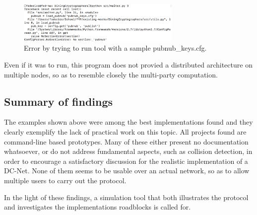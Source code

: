 \begin{figure}[h!]
    \centering
    \includegraphics[width=0.7\textwidth]{Images/work2Error.png}
    \caption{Error by trying to run tool with a sample pubnub{\_}keys.cfg.}
    \label{fig:work2error}
\end{figure}

Even if it was to run, this program does not provied a distributed architecture on multiple nodes, so as to resemble closely the multi-party computation.


\subsection{Summary of findings}
The examples shown above were among the best implementations found and they clearly exemplify the lack of practical work on this topic. All projects found are command-line based prototypes. Many of these either present no documentation whatsoever, or do not address fundamental aspects, such as collision detection, in order to encourage a satisfactory discussion for the realistic implementation of a DC-Net. None of them seems to be usable over an actual network, so as to allow multiple users to carry out the protocol.

In the light of these findings, a simulation tool that both illustrates the protocol and investigates the implementations roadblocks is called for.

